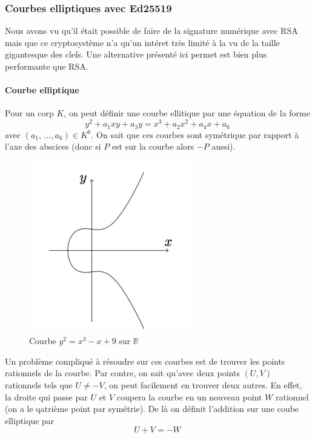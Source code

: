 \documentclass[a4paper, 12pt]{article}
\begin{document}
\subsubsection{Courbes elliptiques avec Ed25519}\label{courbeEd25519}
Nous avons vu qu'il était possible de faire de la signature numérique avec RSA mais que ce cryptosystème n'a qu'un intéret très limité à la vu de la taille gigantesque des clefs. Une alternative présenté ici permet est bien plus performante que RSA.
\paragraph{Courbe elliptique}
\noindent Pour un corp $K$, on peut définir une courbe ellitique par une équation de la forme 
$$
y^2 + a_1xy + a_3y = x^3 + a_2x^2 +a_4x + a_6
$$
avec $(a_1,\, \dots, a_6) \in K^6$. On sait que ces courbes sont symétrique par rapport à l'axe des abscices (donc si $P$ est sur la courbe alors $-P$ aussi). \\

\begin{figure}[h]
	\centering
	\includegraphics[width=.5\textwidth]{img/courbe1.png}
	\caption{Courbe $y^2 = x^3 - x + 9$ sur $\mathbb{R}$}
	\label{courbe1}
\end{figure}



\label{methodecorde}Un problème compliqué à résoudre sur ces courbes est de trouver les points rationnels de la courbe. Par contre, on sait qu'avec deux points $(U, V)$ rationnels tels que $U \neq -V$, on peut facilement en trouver deux autres. En effet, la droite qui passe par $U$ et $V$ coupera la courbe en un nouveau point $W$ rationnel (on a le qatrième point par symétrie).
De là on définit l'addition sur une coube elliptique par 
$$
U + V = - W
$$
\end{document}
